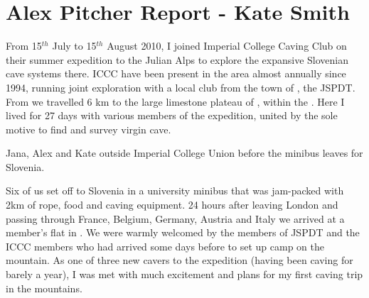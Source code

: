 \section{Alex Pitcher Report - Kate Smith}



From 15\(^{th}\) July to 15\(^{th}\) August 2010, I joined Imperial College Caving Club on their summer expedition
to the Julian Alps to explore the expansive Slovenian cave systems there. ICCC have been present
in the area almost annually since 1994, running joint exploration with a local club from the town
of , the JSPDT. From  we travelled 6 km to the large limestone plateau of , within the . Here I lived for 27 days with various members of the
expedition, united by the sole motive to find and survey virgin cave.



    \begin{marginfigure}
\checkoddpage \ifoddpage \forcerectofloat \else \forceversofloat \fi
\centering
 \caption{Jana, Alex and Kate outside Imperial College Union before the minibus leaves for Slovenia. }
 \label{bus union 2010}
\end{marginfigure}


Six of us set off to Slovenia in a university minibus that was jam-packed with 2km of rope, food
and caving equipment. 24 hours after leaving London and passing through France, Belgium, Germany,
Austria and Italy we arrived at a member's flat in . We were warmly welcomed by the members
of JSPDT and the ICCC members who had arrived some days before to set up camp on the mountain.
As one of three new cavers to the expedition (having been caving for barely a year), I was met with
much excitement and plans for my first caving trip in the mountains.

